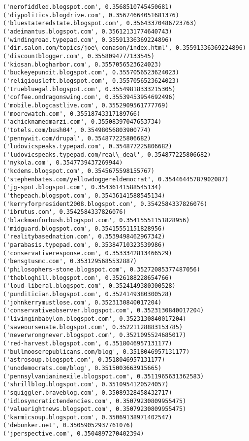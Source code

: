 \documentclass[11pt]{article}
\begin{document}
\begin{Verbatim}[commandchars=\\\{\}]
('nerofiddled.blogspot.com', 0.3568510745450681)
('diypolitics.blogdrive.com', 0.35674664051681376)
('bluestateredstate.blogspot.com', 0.35643370486723763)
('adeimantus.blogspot.com', 0.35612131774640743)
('windingroad.typepad.com', 0.35591336369224896)
('dir.salon.com/topics/joe\_conason/index.html', 0.35591336369224896)
('discountblogger.com', 0.3558094777133545)
('kiosan.blogharbor.com', 0.3557056523624023)
('buckeyepundit.blogspot.com', 0.3557056523624023)
('religiousleft.blogspot.com', 0.3557056523624023)
('truebluegal.blogspot.com', 0.35549818333215305)
('coffee.ondragonswing.com', 0.35539453954692496)
('mobile.blogcastlive.com', 0.3552909561777769)
('moorewatch.com', 0.35518743317189766)
('achicknamedmarzi.com', 0.35508397047653734)
('totels.com/bush04', 0.35498056803900774)
('pennywit.com/drupal', 0.354877225806682)
('ludovicspeaks.typepad.com', 0.354877225806682)
('ludovicspeaks.typepad.com/real\_deal', 0.354877225806682)
('nykola.com', 0.3547739437269944)
('kcdems.blogspot.com', 0.3545675598155767)
('stephenbates.com/yellowdoggereldemocrat', 0.35446445787902087)
('jg-spot.blogspot.com', 0.35436141588545134)
('thepeach.blogspot.com', 0.35436141588545134)
('kerryforpresident2008.blogspot.com', 0.3542584337826076)
('ibrutus.com', 0.3542584337826076)
('blackmanforbush.blogspot.com', 0.35415551151828956)
('midguard.blogspot.com', 0.35415551151828956)
('realitybasednation.com', 0.3539498462967342)
('parabasis.typepad.com', 0.35384710323539986)
('conservativeresponse.com', 0.3533342813466529)
('bensgtusmc.com', 0.3531295685532887)
('philosophers-stone.blogspot.com', 0.35272085377487056)
('thebloghill.blogspot.com', 0.3526188228654766)
('loud-liberal.blogspot.com', 0.3524149380300528)
('punditician.blogspot.com', 0.3524149380300528)
('johnkerrymustlose.com', 0.3523130840017204)
('conservativeobserver.blogspot.com', 0.3523130840017204)
('livinginbabylon.blogspot.com', 0.3523130840017204)
('saveoursenate.blogspot.com', 0.35221128883153785)
('neverwrongnever.blogspot.com', 0.3521095524685017)
('red-harvest.blogspot.com', 0.3518046957131177)
('bullmooserepublicans.com/blog', 0.3518046957131177)
('astrosoup.blogspot.com', 0.3518046957131177)
('unodemocrats.com/blog', 0.3515003663915665)
('pennsylvanianinexile.blogspot.com', 0.3511965631362583)
('shrillblog.blogspot.com', 0.3510954120524057)
('squiggler.braveblog.com', 0.35089328458432717)
('idiosyncratictendencies.com', 0.35079230809955475)
('valuerightnews.blogspot.com', 0.35079230809955475)
('karmicsoup.blogspot.com', 0.35069138971402547)
('debunker.net', 0.35059052937761076)
('jperspective.com', 0.3504897270402394)

\end{Verbatim}
\end{document}
